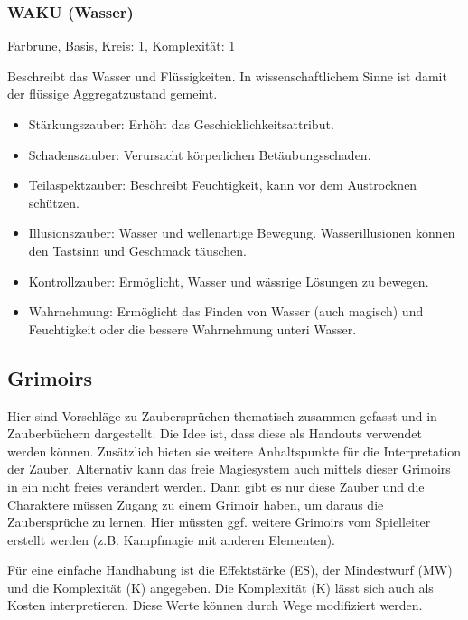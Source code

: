 \documentclass{article}
\begin{document}
\subsubsection{WAKU (Wasser)}

Farbrune, Basis, Kreis: 1, Komplexität: 1

Beschreibt das Wasser und Flüssigkeiten. In wissenschaftlichem Sinne ist damit der flüssige Aggregatzustand gemeint.

\begin{itemize}
\item Stärkungszauber: Erhöht das Geschicklichkeitsattribut.
\item Schadenszauber: Verursacht körperlichen Betäubungsschaden.
\item Teilaspektzauber: Beschreibt Feuchtigkeit, kann vor dem Austrocknen schützen.
\item Illusionszauber: Wasser und wellenartige Bewegung. Wasserillusionen können den Tastsinn und Geschmack täuschen.
\item Kontrollzauber: Ermöglicht, Wasser und wässrige Lösungen zu bewegen.
\item Wahrnehmung: Ermöglicht das Finden von Wasser (auch magisch) und Feuchtigkeit oder die bessere Wahrnehmung unteri Wasser.
\end{itemize}

\begin{center}
\subsection{Grimoirs}
\end{center}

Hier sind Vorschläge zu Zaubersprüchen thematisch zusammen gefasst und in Zauberbüchern dargestellt. Die Idee ist,
dass diese als Handouts verwendet werden können. Zusätzlich bieten sie weitere Anhaltspunkte für die Interpretation
der Zauber. Alternativ kann das freie Magiesystem auch mittels dieser Grimoirs in ein nicht freies verändert werden.
Dann gibt es nur diese Zauber und die Charaktere müssen Zugang zu einem Grimoir haben, um daraus die Zaubersprüche zu
lernen. Hier müssten ggf. weitere Grimoirs vom Spielleiter erstellt werden (z.B. Kampfmagie mit anderen Elementen).

Für eine einfache Handhabung ist die Effektstärke (ES), der Mindestwurf (MW) und die Komplexität (K) angegeben. Die
Komplexität (K) lässt sich auch als Kosten interpretieren. Diese Werte können durch Wege modifiziert werden.
\end{document}
